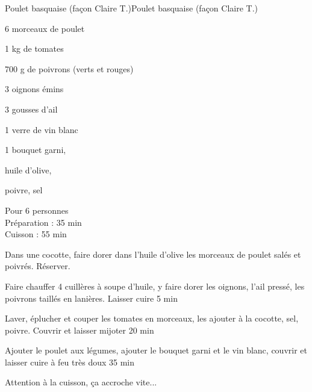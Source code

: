 \begin{recette}{Poulet basquaise (façon Claire T.)}{Poulet basquaise (façon Claire T.)}

\begin{ingredients}
6 morceaux de poulet \par
1 kg de tomates \par
700 g de poivrons (verts et rouges) \par
3 oignons émins \par
3 gousses d'ail\par
1 verre de vin blanc\par
1 bouquet garni,\par
huile d'olive,\par
poivre, sel\par
\end{ingredients}

\begin{infos}
Pour 6 personnes\\
Préparation : 35 min\\
Cuisson : 55 min\\
\end{infos}

\begin{etapes}
\item Dans une cocotte, faire dorer dans l'huile d'olive les morceaux de poulet salés et poivrés. Réserver.
\item Faire chauffer 4 cuillères à soupe d'huile, y faire dorer les oignons, l'ail pressé, les poivrons taillés en lanières. Laisser cuire 5 min
\item Laver, éplucher et couper les tomates en morceaux, les ajouter à la cocotte, sel, poivre. Couvrir et laisser mijoter 20 min
\item Ajouter le poulet aux légumes, ajouter le bouquet garni et le vin blanc, couvrir et laisser cuire à feu très doux 35 min
\end{etapes}

\begin{conseils}
Attention à la cuisson, ça accroche vite...
\end{conseils}

\end{recette}